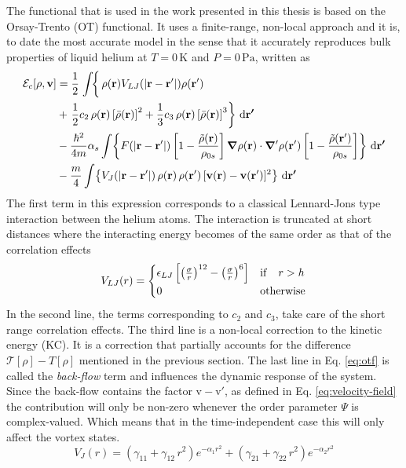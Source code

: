 \documentclass[12pt,a4paper]{book}
\renewcommand{\vec}[1]{\bm{\mathrm{#1}}}
\newcommand{\unit}[1]{\,\mathrm{#1}}
\newcommand{\diff}[1]{\,\mathrm{d}{\vec{#1}}}
\begin{document}
			The functional that is used in the work presented in this thesis is based on the Orsay-Trento (OT) functional. It uses a finite-range, non-local approach and it is, to date the most accurate model in the sense that it accurately reproduces bulk properties of liquid helium at $T=0\unit{K}$ and $P=0\unit{Pa}$, written as		
			\begin{align}
				{\cal E}_c[\rho ,\mathbf{v}] &=  
				\frac{1}{2} \left.\int \! \right\{\rho({\bf r}) V_{LJ}(|{\bf r}-{\bf r'}|) \rho({\bf r'}) \nonumber \\
				&+ \left.\frac{1}{2} c_2\, \rho({\bf r}) \left[{\bar \rho}({\bf r}) \right]^2 
				+ \frac{1}{3} c_3 \, \rho({\bf r}) \left[ {\bar \rho}({\bf r}) \right]^3\right\}\diff{r'} \nonumber \\
				&- \frac{\hbar^2}{4m} \alpha_s \int \! \left\{ F(|{\bf r}-{\bf r'}|) \left[ 1- \frac{{\tilde \rho}({\bf r})}{\rho_{0s}} \right]\grad{\rho({\bf r})} \cdot \grad'\rho({\bf r'}) \left[ 1- \frac{{\tilde \rho}({\bf r'})}{\rho_{0s}} \right]\right\}\diff{r'} \nonumber \\
				& - \frac{m}{4} \int \! \left\{V_J(| \mathbf{r} - \mathbf{r}'|)\, \rho(\mathbf{r}) \, \rho(\mathbf{r}')\,  [\mathbf{v}(\mathbf{r}) - \mathbf{v}(\mathbf{r}')]^2 \right\}\diff{r'} \label{eq:otf}
			\end{align}
			The first term in this expression corresponds to a classical Lennard-Jons type interaction between the helium atoms. The interaction is truncated at short distances where the interacting energy becomes of the same order as that of the correlation effects
			\begin{align}
				V_{LJ}(r) = \begin{cases}
				\epsilon_{LJ} \left[\left(\frac{\sigma}{r} \right)^{12} - \left(\frac{\sigma}{r} \right)^{6} \right] & {\rm if} \quad r > h \\
				0 & {\rm otherwise}
				\end{cases}\label{eq9}
			\end{align}
			In the second line, the terms corresponding to $c_2$ and $c_3$, take care of the short range correlation effects. The third line is a non-local correction to the kinetic energy (KC). It is a correction that partially accounts for the difference $\mathcal{T}[\rho]-T[\rho]$ mentioned in the previous section. The last line in Eq. \ref{eq:otf} is called the \emph{back-flow} term and influences the dynamic response of the system. Since the back-flow contains the factor $\vec{v}-\vec{v'}$, as defined in Eq. \ref{eq:velocity-field} the contribution will only be non-zero whenever the order parameter $\Psi$ is complex-valued. Which means that in the time-independent case this will only affect the vortex states. 
			\begin{equation}
			V_J(r) = (\gamma_{11} +\gamma_{12} \, r^2) e^{-\alpha_1 r^2}+(\gamma_{21} +\gamma_{22} \, r^2) e^{-\alpha_2 r^2}
			\label{eq15}
			\end{equation}
			
\end{document}
